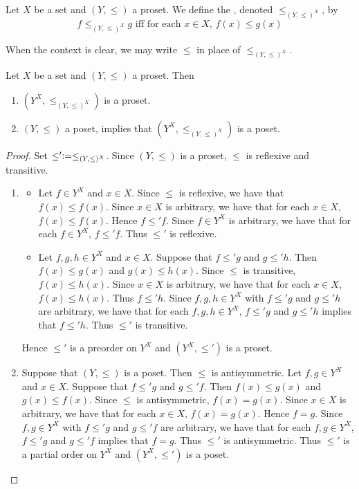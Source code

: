\documentclass{book}
\begin{document}
	\begin{defn} 
		Let $X$ be a set and $(Y, \leq)$ a proset. We define the , denoted $\leq_{(Y, \leq)^X}$, by 
		$$\text{$f \leq_{(Y, \leq)^X} g$ iff for each $x \in X$, $f(x) \leq g(x)$}$$
	\end{defn}
	
	\begin{note}
		When the context is clear, we may write $\leq$ in place of $\leq_{(Y, \leq)^X}$. 
	\end{note}
	
	\begin{ex} 
		Let $X$ be a set and $(Y, \leq)$ a proset. Then 
		\begin{enumerate}
			\item $(Y^X, \leq_{(Y, \leq)^X})$ is a proset.
			\item $(Y, \leq)$ a poset, implies that $(Y^X, \leq_{(Y, \leq)^X})$ is a poset.
		\end{enumerate}
	\end{ex}
	
	\begin{proof}
		Set $\leq' \vcentcolon= \leq_{(Y, \leq)^X}$. Since $(Y, \leq)$ is a proset, $\leq$ is reflexive and transitive.
		\begin{enumerate}
			\item \begin{itemize}
				\item Let $f \in Y^X$ and $x \in X$. Since $\leq$ is reflexive, we have that
				$f(x) \leq f(x)$. Since $x \in X$ is arbitrary, we have that for each $x \in X$, $f(x) \leq f(x)$. Hence $f \leq' f$. Since $f \in Y^X$ is arbitrary, we have that for each $f \in Y^X$, $f \leq' f$. Thus $\leq'$ is reflexive.
				\item Let $f, g, h \in Y^X$ and $x \in X$. Suppose that $f \leq' g$ and $g \leq' h$. Then $f(x) \leq g(x)$ and $g(x) \leq h(x)$. Since $\leq$ is transitive, $f(x) \leq h(x)$. Since $x \in X$ is arbitrary, we have that for each $x \in X$, $f(x) \leq h(x)$. Thus $f \leq' h$. Since $f, g, h \in Y^X$ with $f \leq' g$ and $g \leq' h$ are arbitrary, we have that for each $f, g, h \in Y^X$, $f \leq' g$ and $g \leq' h$ implies that $f \leq' h$. Thus $\leq'$ is transitive. 
			\end{itemize}
			Hence $\leq'$ is a preorder on $Y^X$ and $(Y^X, \leq')$ is a proset.
			\item Suppose that $(Y, \leq)$ is a poset. Then $\leq$ is antisymmetric. Let $f,g \in Y^X$ and $x \in X$. Suppose that $f \leq' g$ and $g \leq' f$. Then $f(x) \leq g(x)$ and $g(x) \leq f(x)$. Since $\leq$ is antisymmetric, $f(x) = g(x)$. Since $x \in X$ is arbitrary, we have that for each $x \in X$, $f(x) = g(x)$. Hence $f = g$. Since $f,g \in Y^X$ with $f \leq' g$ and $g \leq' f$ are arbitrary, we have that for each $f,g \in Y^X$, $f \leq' g$ and $g \leq' f$ implies that $f = g$. Thus $\leq'$ is antisymmetric. Thus $\leq'$ is a partial order on $Y^X$ and $(Y^X, \leq')$ is a poset. 
		\end{enumerate}
	\end{proof}
	
\end{document}
